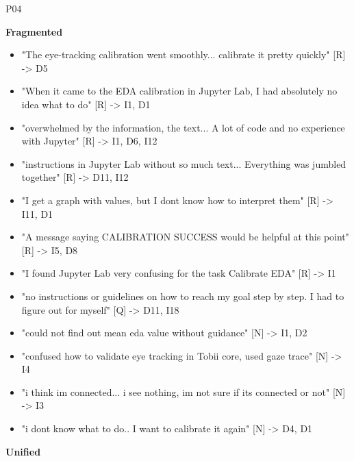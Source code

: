 \documentclass[
]{article}
\begin{document}
P04

\textbf{Fragmented}

\begin{itemize}
\item
  "The eye-tracking calibration went smoothly... calibrate it pretty quickly" {[}R{]} -\textgreater{} D5
\item
  "When it came to the EDA calibration in Jupyter Lab, I had absolutely no idea what to do" {[}R{]} -\textgreater{} I1, D1
\item
  "overwhelmed by the information, the text... A lot of code and no experience with Jupyter" {[}R{]} -\textgreater{} I1, D6, I12
\item
  "instructions in Jupyter Lab without so much text... Everything was jumbled together" {[}R{]} -\textgreater{} D11, I12
\item
  "I get a graph with values, but I don\textquotesingle t know how to interpret them" {[}R{]} -\textgreater{} I11, D1
\item
  "A message saying CALIBRATION SUCCESS would be helpful at this point" {[}R{]} -\textgreater{} I5, D8
\item
  "I found Jupyter Lab very confusing for the task Calibrate EDA" {[}R{]} -\textgreater{} I1
\item
  "no instructions or guidelines on how to reach my goal step by step. I had to figure out for myself" {[}Q{]} -\textgreater{} D11, I18
\item
  "could not find out mean eda value without guidance" {[}N{]} -\textgreater{} I1, D2
\item
  "confused how to validate eye tracking in Tobii core, used gaze trace" {[}N{]} -\textgreater{} I4
\item
  "i think im connected... i see nothing, im not sure if its connected or not" {[}N{]} -\textgreater{} I3
\item
  "i dont know what to do.. I want to calibrate it again" {[}N{]} -\textgreater{} D4, D1
\end{itemize}

\textbf{Unified}
\end{document}
